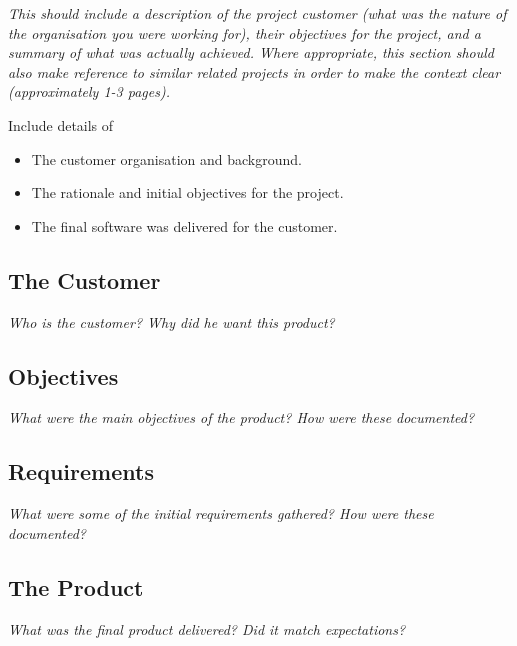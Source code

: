 \documentclass[../dissertation.tex]{subfiles}
\begin{document}
\textit{This should include a description of the project customer (what was the nature of the organisation you were working for), their objectives for the project, and a summary of what was actually achieved. Where appropriate, this section should also make reference to similar related projects in order to make the context clear (approximately 1-3 pages).}

Include details of
\begin{itemize}
\item The customer organisation and background.
\item The rationale and initial objectives for the project.
\item The final software was delivered for the customer.
\end{itemize}

\subsection{The Customer}

\textit{Who is the customer? Why did he want this product?}

\subsection{Objectives}

\textit{What were the main objectives of the product? How were these documented?}

\subsection{Requirements}

\textit{What were some of the initial requirements gathered? How were these documented?}

\subsection{The Product}

\textit{What was the final product delivered? Did it match expectations?}
\end{document}
